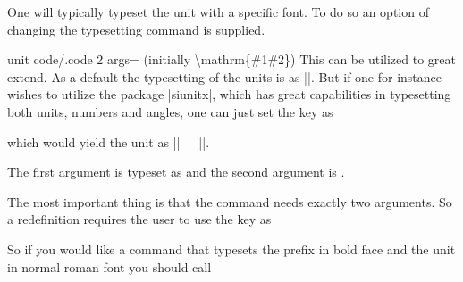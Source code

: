 One will typically typeset the unit with a specific font. To do so an option of changing the typesetting command is supplied.
\begin{pgfplotskey}{unit code/.code 2 args= (initially \textbackslash mathrm\{\#1\#2\})}
  This can be utilized to great extend. As a default the typesetting of the units is as ||. But if one for instance
  wishes to utilize the package |siunitx|, which has great capabilities in typesetting both units, numbers and angles, one can just set the key as
\begin{codeexample}
\end{codeexample}
  which would yield the unit as |\si{||}|. 

  The first argument is typeset as  and the second argument is .
  
  The most important thing is that the command needs exactly two arguments. So a redefinition requires the user to use the key as
\begin{codeexample}
\end{codeexample}
So if you would like a command that typesets the prefix in bold face and the unit in normal roman font you should call
\begin{codeexample}[code only]
  \pgfplotsset{unit code/.code 2 args={\mathbf{#1}\mathrm{#2}}
\end{codeexample}
\end{pgfplotskey}


